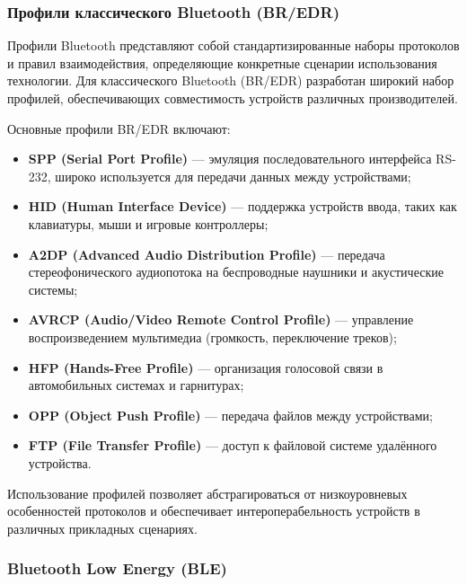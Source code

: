 \subsubsection{Профили классического Bluetooth (BR/EDR)}

Профили Bluetooth представляют собой стандартизированные наборы протоколов и правил взаимодействия, определяющие конкретные сценарии использования технологии. Для классического Bluetooth (BR/EDR) разработан широкий набор профилей, обеспечивающих совместимость устройств различных производителей.

Основные профили BR/EDR включают:
\begin{itemize}[nosep]
    \item \textbf{SPP (Serial Port Profile)} --- эмуляция последовательного интерфейса RS-232, широко используется для передачи данных между устройствами;
    
    \item \textbf{HID (Human Interface Device)} --- поддержка устройств ввода, таких как клавиатуры, мыши и игровые контроллеры;
    
    \item \textbf{A2DP (Advanced Audio Distribution Profile)} --- передача стереофонического аудиопотока на беспроводные наушники и акустические системы;
    
    \item \textbf{AVRCP (Audio/Video Remote Control Profile)} --- управление воспроизведением мультимедиа (громкость, переключение треков);
    
    \item \textbf{HFP (Hands-Free Profile)} --- организация голосовой связи в автомобильных системах и гарнитурах;
    
    \item \textbf{OPP (Object Push Profile)} --- передача файлов между устройствами;
    
    \item \textbf{FTP (File Transfer Profile)} --- доступ к файловой системе удалённого устройства.
\end{itemize}

Использование профилей позволяет абстрагироваться от низкоуровневых особенностей протоколов и обеспечивает интероперабельность устройств в различных прикладных сценариях.

\subsubsection{Bluetooth Low Energy (BLE)}

